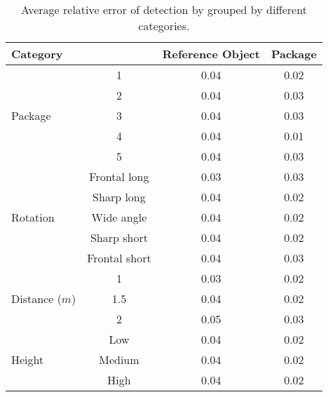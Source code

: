 \begin{table}%
\centering
\begin{tabular}{lccc}
\toprule
\multicolumn{2}{l}{Category} & Reference Object & Package\\
\midrule

\multirow{5}{*}{Package} 
& 1 & 0.04 & 0.02\\ 
& 2 & 0.04 & 0.03\\
& 3 & 0.04 & 0.03\\
& 4 & 0.04 & 0.01\\
& 5 & 0.04 & 0.03\\
\midrule

\multirow{5}{*}{Rotation}
& Frontal long		& 0.03 & 0.03 \\ 
& Sharp long	& 0.04 & 0.02 \\
& Wide angle 	& 0.04 & 0.02 \\
& Sharp short 	& 0.04 & 0.02 \\
& Frontal short	& 0.04 & 0.03 \\
\midrule
\multirow{3}{*}{Distance ($m$)} 
& 1 			& 0.03 & 0.02  \\ 
& 1.5  			& 0.04 & 0.02  \\
& 2 			& 0.05 & 0.03  \\
\midrule
\multirow{3}{*}{Height} 
& Low 		& 0.04 & 0.02 \\ 
& Medium 	& 0.04 & 0.02 \\
& High		& 0.04 & 0.02 \\
\bottomrule
 \end{tabular}
 \caption{Average relative error of detection by grouped by different categories.}
\label{table:detection_categories_error}
\end{table}
